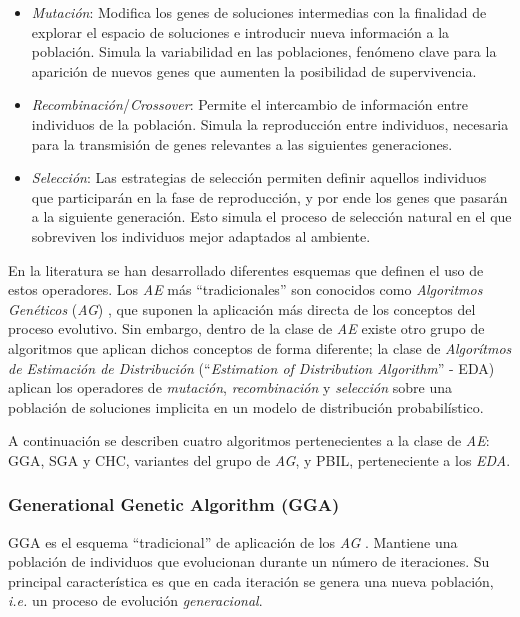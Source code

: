 \begin{itemize}
\item \emph{Mutación}: Modifica los genes de soluciones intermedias con la finalidad de explorar el espacio de soluciones e introducir nueva información a la población. Simula la variabilidad en las poblaciones, fenómeno clave para la aparición de nuevos genes que aumenten la posibilidad de supervivencia.
\item \emph{Recombinación}/\emph{Crossover}: Permite el intercambio de información entre individuos de la población. Simula la reproducción entre individuos, necesaria para la transmisión de genes relevantes a las siguientes generaciones.
\item \emph{Selección}: Las estrategias de selección permiten definir aquellos individuos que participarán en la fase de reproducción, y por ende los genes que pasarán a la siguiente generación. Esto simula el proceso de selección natural en el que sobreviven los individuos mejor adaptados al ambiente.
\end{itemize}

En la literatura se han desarrollado diferentes esquemas que definen el uso de estos operadores. Los \emph{AE} más ``tradicionales'' son conocidos como \emph{Algoritmos Genéticos} (\emph{AG}) \cite{holland1975adaptation}, que suponen la aplicación más directa de los conceptos del proceso evolutivo. Sin embargo, dentro de la clase de \emph{AE} existe otro grupo de algoritmos que aplican dichos conceptos de forma diferente; la clase de \emph{Algorítmos de Estimación de Distribución} (``\emph{Estimation of Distribution Algorithm}'' - EDA) aplican los operadores de \emph{mutación}, \emph{recombinación} y \emph{selección} sobre una población de soluciones implicita en un modelo de distribución probabilístico.

A continuación se describen cuatro algoritmos pertenecientes a la clase de \emph{AE}: GGA, SGA y CHC, variantes del grupo de \emph{AG}, y PBIL, perteneciente a los \emph{EDA}.

\subsubsection{Generational Genetic Algorithm (GGA)}

GGA es el esquema ``tradicional'' de aplicación de los \emph{AG} \cite{back1996evolutionary,Muhlenbein91evolutionin}. Mantiene una población de individuos que evolucionan durante un número de iteraciones. Su principal característica es que en cada iteración se genera una nueva población, \emph{i.e.} un proceso de evolución \emph{generacional}.

